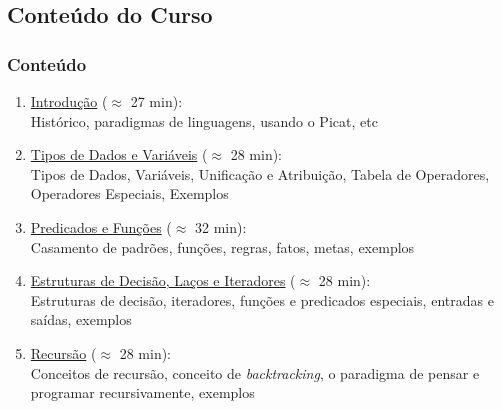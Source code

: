 \subsection{Conteúdo do Curso}
			
\begin{frame}[fragile]
  \frametitle{Conteúdo}
  \begin{enumerate}

					
    \item  \underline{Introdução} ($\approx$ 27 min):\\
    Histórico, paradigmas de linguagens, usando o Picat, etc

    \pause
    \item \underline{Tipos de Dados e Variáveis} ($\approx$ 28 min):\\
Tipos de Dados, Variáveis, Unificação e Atribuição, Tabela de Operadores, Operadores Especiais,
 Exemplos
    
    \pause
		\item \underline{Predicados e Funções} ($\approx$ 32 min):\\
Casamento de padrões, funções, regras, fatos, metas, exemplos
		
    \pause
    \item \underline{Estruturas de Decisão, Laços e Iteradores} ($\approx$ 28 min):\\
Estruturas de decisão, iteradores, funções e predicados especiais, 
entradas e saídas, exemplos
    
    \pause
		\item  \underline{Recursão} ($\approx$ 28 min):\\
     Conceitos de recursão, conceito de \textit{backtracking}, o paradigma
     de pensar e programar recursivamente, exemplos
\end{enumerate}

\end{frame}




